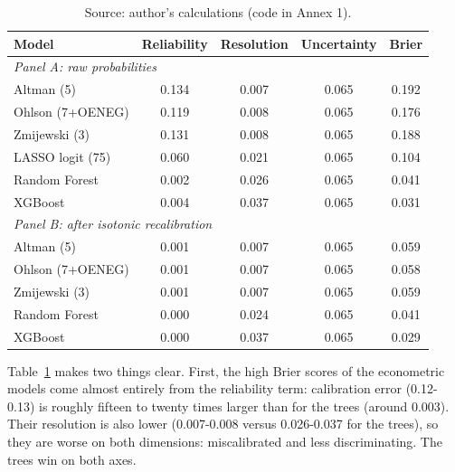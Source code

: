 \documentclass[12pt,a4paper]{article}
\begin{document}
\begin{table}[ht]
\centering
\caption{Brier-score decomposition at horizon H1, before and after isotonic
recalibration. Reliability is calibration error (lower is better); resolution
is sorting power (higher is better); uncertainty (0.065) is the same for all
models. The three terms recombine to the Brier score via
Equation~\ref{eq:brier-decomp}.}
\label{tab:brier-decomp}
\small
\begin{tabular}{lcccc}
\toprule
Model & Reliability & Resolution & Uncertainty & Brier \\
\midrule
\multicolumn{5}{l}{\textit{Panel A: raw probabilities}} \\
\midrule
Altman (5)        & 0.134 & 0.007 & 0.065 & 0.192 \\
Ohlson (7+OENEG)  & 0.119 & 0.008 & 0.065 & 0.176 \\
Zmijewski (3)     & 0.131 & 0.008 & 0.065 & 0.188 \\
LASSO logit (75)  & 0.060 & 0.021 & 0.065 & 0.104 \\
Random Forest     & 0.002 & 0.026 & 0.065 & 0.041 \\
XGBoost           & 0.004 & 0.037 & 0.065 & 0.031 \\
\midrule
\multicolumn{5}{l}{\textit{Panel B: after isotonic recalibration}} \\
\midrule
Altman (5)        & 0.001 & 0.007 & 0.065 & 0.059 \\
Ohlson (7+OENEG)  & 0.001 & 0.007 & 0.065 & 0.058 \\
Zmijewski (3)     & 0.001 & 0.007 & 0.065 & 0.059 \\
Random Forest     & 0.000 & 0.024 & 0.065 & 0.041 \\
XGBoost           & 0.000 & 0.037 & 0.065 & 0.029 \\
\bottomrule
\end{tabular}
\caption*{\footnotesize Source: author's calculations (code in Annex 1).}
\end{table}

Table~\ref{tab:brier-decomp} makes two things clear. First, the high Brier
scores of the econometric models come almost entirely from the reliability
term: calibration error (0.12-0.13) is roughly fifteen to twenty times
larger than for the trees (around 0.003). Their resolution is also lower
(0.007-0.008 versus 0.026-0.037 for the trees), so they are worse on both
dimensions: miscalibrated and less discriminating. The trees win on both axes.
\end{document}
